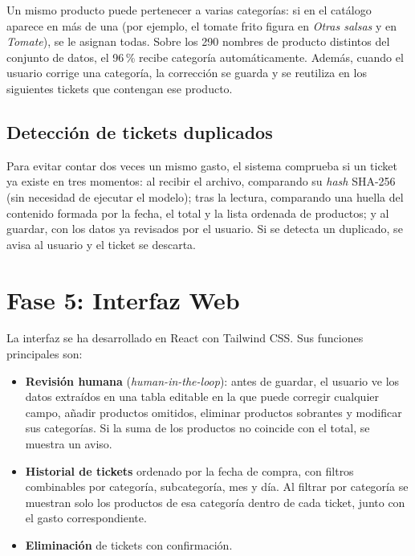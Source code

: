 Un mismo producto puede pertenecer a varias categorías: si en el catálogo aparece en más de una (por ejemplo, el tomate frito figura en \textit{Otras salsas} y en \textit{Tomate}), se le asignan todas. Sobre los 290 nombres de producto distintos del conjunto de datos, el 96\,\% recibe categoría automáticamente. Además, cuando el usuario corrige una categoría, la corrección se guarda y se reutiliza en los siguientes tickets que contengan ese producto.

\subsection{Detección de tickets duplicados}
Para evitar contar dos veces un mismo gasto, el sistema comprueba si un ticket ya existe en tres momentos: al recibir el archivo, comparando su \textit{hash} SHA-256 (sin necesidad de ejecutar el modelo); tras la lectura, comparando una huella del contenido formada por la fecha, el total y la lista ordenada de productos; y al guardar, con los datos ya revisados por el usuario. Si se detecta un duplicado, se avisa al usuario y el ticket se descarta.

\section{Fase 5: Interfaz Web}
La interfaz se ha desarrollado en React con Tailwind CSS. Sus funciones principales son:

\begin{itemize}
    \item \textbf{Revisión humana} (\textit{human-in-the-loop}): antes de guardar, el usuario ve los datos extraídos en una tabla editable en la que puede corregir cualquier campo, añadir productos omitidos, eliminar productos sobrantes y modificar sus categorías. Si la suma de los productos no coincide con el total, se muestra un aviso.
    \item \textbf{Historial de tickets} ordenado por la fecha de compra, con filtros combinables por categoría, subcategoría, mes y día. Al filtrar por categoría se muestran solo los productos de esa categoría dentro de cada ticket, junto con el gasto correspondiente.
    \item \textbf{Eliminación} de tickets con confirmación.
\end{itemize}
